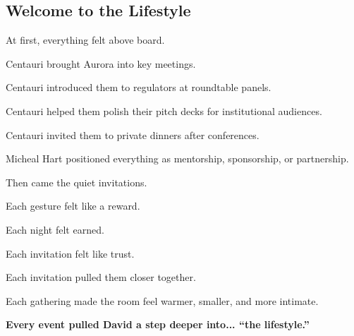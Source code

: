 
\subsection{Welcome to the Lifestyle}

At first, everything felt above board.

Centauri brought Aurora into key meetings.  

Centauri introduced them to regulators at roundtable panels.  

Centauri helped them polish their pitch decks for institutional audiences.  

Centauri invited them to private dinners after conferences.

Micheal Hart positioned everything as mentorship, sponsorship, or partnership.

Then came the quiet invitations.

Each gesture felt like a reward. 

Each night felt earned. 

Each invitation felt like trust.

Each invitation pulled them closer together. 

Each gathering made the room feel warmer, smaller, and more intimate.  

\textbf{Every event pulled David a step deeper into... ``the lifestyle.''}

\medskip

